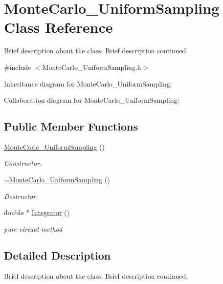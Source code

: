 \hypertarget{class_monte_carlo___uniform_sampling}{}\section{Monte\+Carlo\+\_\+\+Uniform\+Sampling Class Reference}
\label{class_monte_carlo___uniform_sampling}


Brief description about the class. Brief description continued.  




{\ttfamily \#include $<$Monte\+Carlo\+\_\+\+Uniform\+Sampling.\+h$>$}



Inheritance diagram for Monte\+Carlo\+\_\+\+Uniform\+Sampling\+:


Collaboration diagram for Monte\+Carlo\+\_\+\+Uniform\+Sampling\+:
\subsection*{Public Member Functions}
\begin{DoxyCompactItemize}
\item 
\hyperlink{class_monte_carlo___uniform_sampling_a1bf0ba8eb4f67d693a21e2d40601ee17}{Monte\+Carlo\+\_\+\+Uniform\+Sampling} ()
\begin{DoxyCompactList}\small\item\em Constructor. \end{DoxyCompactList}\item 
\hyperlink{class_monte_carlo___uniform_sampling_a1ccdb02604ffeb1f334b55ec24584f0c}{$\sim$\+Monte\+Carlo\+\_\+\+Uniform\+Sampling} ()
\begin{DoxyCompactList}\small\item\em Destructor. \end{DoxyCompactList}\item 
double $\ast$ \hyperlink{class_monte_carlo___uniform_sampling_a1920387a9f817c8179531fa02f7c00d3}{Integrator} ()
\begin{DoxyCompactList}\small\item\em pure virtual method \end{DoxyCompactList}\end{DoxyCompactItemize}


\subsection{Detailed Description}
Brief description about the class. Brief description continued. 

